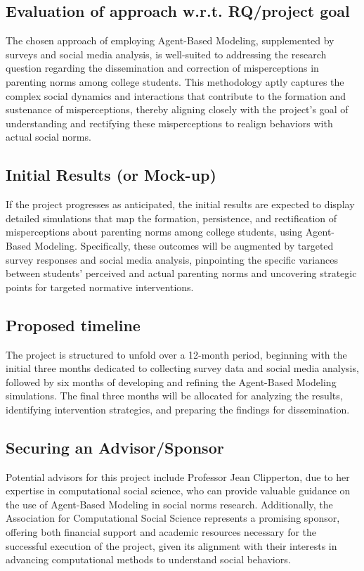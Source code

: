 \documentclass{article}
\begin{document}
\subsection*{Evaluation of approach w.r.t. RQ/project goal}
The chosen approach of employing Agent-Based Modeling, supplemented by surveys and social media analysis, is well-suited to addressing the research question regarding the dissemination and correction of misperceptions in parenting norms among college students. This methodology aptly captures the complex social dynamics and interactions that contribute to the formation and sustenance of misperceptions, thereby aligning closely with the project's goal of understanding and rectifying these misperceptions to realign behaviors with actual social norms.

\subsection*{Initial Results (or Mock-up)}
If the project progresses as anticipated, the initial results are expected to display detailed simulations that map the formation, persistence, and rectification of misperceptions about parenting norms among college students, using Agent-Based Modeling. Specifically, these outcomes will be augmented by targeted survey responses and social media analysis, pinpointing the specific variances between students' perceived and actual parenting norms and uncovering strategic points for targeted normative interventions.

\subsection*{Proposed timeline}
The project is structured to unfold over a 12-month period, beginning with the initial three months dedicated to collecting survey data and social media analysis, followed by six months of developing and refining the Agent-Based Modeling simulations. The final three months will be allocated for analyzing the results, identifying intervention strategies, and preparing the findings for dissemination.

\subsection*{Securing an Advisor/Sponsor}
Potential advisors for this project include Professor Jean Clipperton, due to her expertise in computational social science, who can provide valuable guidance on the use of Agent-Based Modeling in social norms research. Additionally, the Association for Computational Social Science represents a promising sponsor, offering both financial support and academic resources necessary for the successful execution of the project, given its alignment with their interests in advancing computational methods to understand social behaviors.
\end{document}
